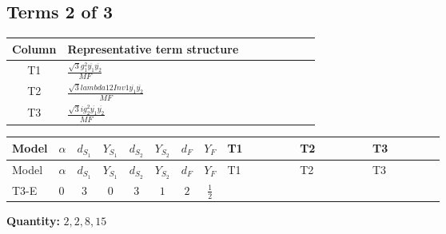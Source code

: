 \documentclass[8pt]{article}
\begin{document}
\begin{landscape}
\subsection*{Terms 2 of 3}
\begin{center}
\begin{tabular}{@{}c >{\raggedright\arraybackslash}p{0.82\linewidth}@{}}
\toprule
Column & Representative term structure \\
\midrule
T1 & \(\displaystyle \frac{\sqrt{3} g_{1}^{2} \overline{y_{1}} \overline{y_{2}}}{MF}\) \\
\midrule
T2 & \(\displaystyle \frac{\sqrt{3} lambda12Inv1 \overline{y_{1}} \overline{y_{2}}}{MF}\) \\
\midrule
T3 & \(\displaystyle \frac{\sqrt{3} i g_{2}^{2} \overline{y_{1}} \overline{y_{2}}}{MF}\) \\
\midrule
\bottomrule
\end{tabular}
\end{center}
\smallskip
\tiny
\begin{longtable}{@{}llcccccc >{\raggedright\arraybackslash}p{0.21\linewidth} >{\raggedright\arraybackslash}p{0.21\linewidth} >{\raggedright\arraybackslash}p{0.21\linewidth}@{}}
\toprule
Model & $\alpha$ & $d_{S_1}$ & $Y_{S_1}$ & $d_{S_2}$ & $Y_{S_2}$ & $d_F$ & $Y_F$ & T1 & T2 & T3 \\
\midrule
\endfirsthead
\toprule
Model & $\alpha$ & $d_{S_1}$ & $Y_{S_1}$ & $d_{S_2}$ & $Y_{S_2}$ & $d_F$ & $Y_F$ & T1 & T2 & T3 \\
\midrule
\endhead
T3-E & $0$ & $3$ & $0$ & $3$ & $1$ & $2$ & $\frac{1}{2}$ & \scriptsize\adjustbox{max width=\linewidth}{$\begin{gathered} - \frac{\sqrt{3} g_{1}^{2} \overline{y_{1}} \overline{y_{2}}}{8 MF}\end{gathered}$} & \scriptsize\adjustbox{max width=\linewidth}{$\begin{gathered} \frac{\sqrt{3} lambda12Inv1 \overline{y_{1}} \overline{y_{2}}}{6 MF}\end{gathered}$} & \scriptsize\adjustbox{max width=\linewidth}{$\begin{gathered} - \frac{\sqrt{3} i g_{2}^{2} \overline{y_{1}} \overline{y_{2}}}{6 MF}\end{gathered}$} \\
\midrule
\bottomrule
\end{longtable}
\clearpage
\noindent\textbf{Quantity: }$\mathrm{2,2,8,15}$\par\smallskip

\end{landscape}
\end{document}
